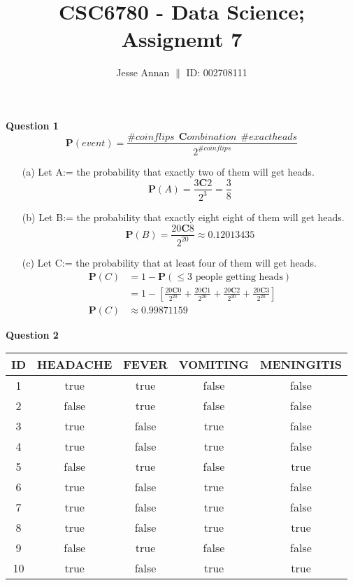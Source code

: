 \documentclass[10pt,a4paper]{article}
\title{CSC6780 - Data Science; Assignemt 7}
\author{Jesse Annan \hspace{0.5cm} $\|$ \hspace{0.5cm} ID: 002708111}
\newcommand{\cc}{\textbf{C}}
\newcommand{\p}{\textbf{P}}
\begin{document}
	\maketitle
	
	\clearpage
	
	\textbf{Question 1} $$\p(event) = \frac{\#coin flips \ \ \cc ombination \ \ \#exact heads}{2^{\#coin flips}}$$
	
	\begin{enumerate}
		\item[(a)] Let A:= the probability that exactly two of them will get heads. \newline
		$$\p(A) = \frac{3 \cc 2}{2^{3}} = \frac{3}{8}$$ 
		
		\item[(b)] Let B:= the probability that exactly eight eight of them will get heads. \newline
		$$\p(B) = \frac{20 \cc 8}{2^{20}} \approx 0.12013435 $$
		
		\item[(c)] Let C:= the probability that at least four of them will get heads. %
		\begin{equation*}
			\begin{split}
				\p(C) & = 1 - \p(\leq \text{3 people getting heads}) \\
				& = 1 - \left[ \frac{20 \cc 0}{2^{20}} + \frac{20 \cc 1}{2^{20}} + \frac{20 \cc 2}{2^{20}} + \frac{20 \cc 3}{2^{20}} \right] \\
				\p(C) & \approx 0.99871159
			\end{split}
		\end{equation*}
	\end{enumerate}
	
	\newpage
	
	\textbf{Question 2} \begin{table}[h!]
		\begin{tabular}{ccccc}
			\toprule
			 \textbf{ID} & \textbf{HEADACHE} & \textbf{FEVER} & \textbf{VOMITING} & \textbf{MENINGITIS} \\ \midrule
			1 & true & true & false & false \\
			2 & false & true & false & false \\
			3 & true & false & true & false \\
			4 & true & false & true & false \\
			5 & false & true & false & true \\
			6 & true & false & true & false \\
			7 & true & false & true & false \\
			8 & true & false & true & true \\
			9 & false & true & false & false \\ 
			10 & true & false & true & true  \\
			\bottomrule
		\end{tabular}
		\end{table}
	
\end{document}
